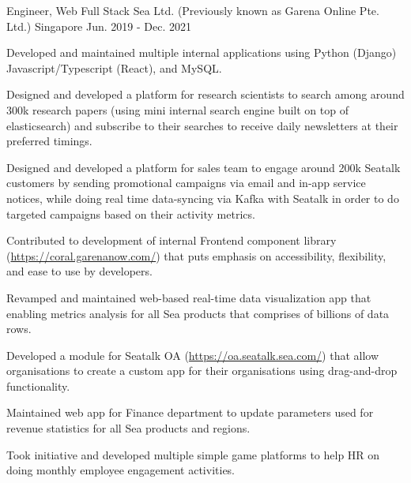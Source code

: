 

\begin{cventries}

  \cventry
    {Engineer, Web Full Stack} %
    {Sea Ltd. (Previously known as Garena Online Pte. Ltd.)} %
    {Singapore} %
    {Jun. 2019 - Dec. 2021} %
    {
      \begin{cvitems} %
        \item {Developed and maintained multiple internal applications using Python (Django) Javascript/Typescript (React), and MySQL.}
        \item {Designed and developed a platform for research scientists to search among around 300k research papers (using mini internal search engine built on top of elasticsearch) and subscribe to their searches to receive daily newsletters at their preferred timings.}
        \item {Designed and developed a platform for sales team to engage around 200k Seatalk customers by sending promotional campaigns via email and in-app service notices, while doing real time data-syncing via Kafka with Seatalk in order to do targeted campaigns based on their activity metrics.}
        \item {Contributed to development of internal Frontend component library (\url{https://coral.garenanow.com/}) that puts emphasis on accessibility, flexibility, and ease to use by developers.}
        \item {Revamped and maintained web-based real-time data visualization app that enabling metrics analysis for all Sea products that comprises of billions of data rows.}
        \item {Developed a module for Seatalk OA (\url{https://oa.seatalk.sea.com/}) that allow organisations to create a custom app for their organisations using drag-and-drop functionality.}
        \item {Maintained web app for Finance department to update parameters used for revenue statistics for all Sea products and regions.}
        \item {Took initiative and developed multiple simple game platforms to help HR on doing monthly employee engagement activities.}
      \end{cvitems}
    }


\end{cventries}
